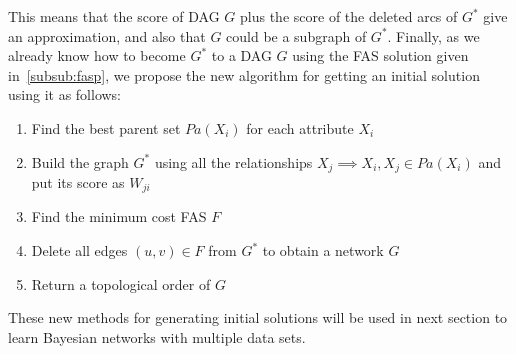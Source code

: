 	This means that the score of DAG $G$ plus the score of the deleted arcs of $G^*$ give an approximation, and also that $G$ could be a subgraph of $G^*$.
	Finally, as we already know how to become $G^*$ to a DAG $G$ using the FAS solution given in~\ref{subsub:fasp}, we propose the new algorithm for getting an initial solution using it as follows:
	\begin{enumerate}
		\item Find the best parent set ${Pa}( X_i )$ for each attribute $X_i$
		\item Build the graph $G^*$ using all the relationships $X_j \implies X_i, X_j \in {Pa}( X_i )$ and put its score as $W_{ji}$
		\item Find the minimum cost FAS $F$
		\item Delete all edges $(u,v) \in F$ from $G^*$ to obtain a network $G$
		\item Return a topological order of $G$
	\end{enumerate}

These new methods for generating initial solutions will be used in next section to learn Bayesian networks with multiple data sets.
